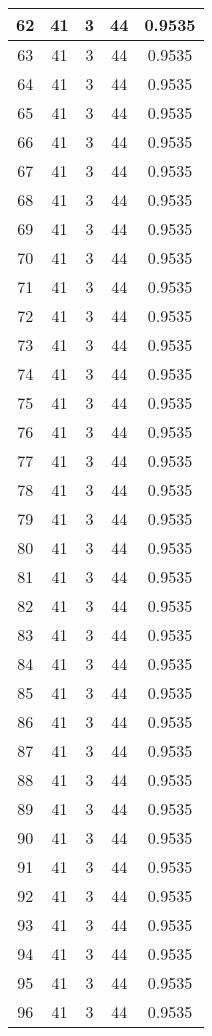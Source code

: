 \documentclass[letterpaper, 12pt]{article}
\begin{document}
\begin{longtable}{|c|c|c|c|c|}
\hline
62 & 41 & 3 & 44 & 0.9535 \\
\hline
63 & 41 & 3 & 44 & 0.9535 \\
\hline
64 & 41 & 3 & 44 & 0.9535 \\
\hline
65 & 41 & 3 & 44 & 0.9535 \\
\hline
66 & 41 & 3 & 44 & 0.9535 \\
\hline
67 & 41 & 3 & 44 & 0.9535 \\
\hline
68 & 41 & 3 & 44 & 0.9535 \\
\hline
69 & 41 & 3 & 44 & 0.9535 \\
\hline
70 & 41 & 3 & 44 & 0.9535 \\
\hline
71 & 41 & 3 & 44 & 0.9535 \\
\hline
72 & 41 & 3 & 44 & 0.9535 \\
\hline
73 & 41 & 3 & 44 & 0.9535 \\
\hline
74 & 41 & 3 & 44 & 0.9535 \\
\hline
75 & 41 & 3 & 44 & 0.9535 \\
\hline
76 & 41 & 3 & 44 & 0.9535 \\
\hline
77 & 41 & 3 & 44 & 0.9535 \\
\hline
78 & 41 & 3 & 44 & 0.9535 \\
\hline
79 & 41 & 3 & 44 & 0.9535 \\
\hline
80 & 41 & 3 & 44 & 0.9535 \\
\hline
81 & 41 & 3 & 44 & 0.9535 \\
\hline
82 & 41 & 3 & 44 & 0.9535 \\
\hline
83 & 41 & 3 & 44 & 0.9535 \\
\hline
84 & 41 & 3 & 44 & 0.9535 \\
\hline
85 & 41 & 3 & 44 & 0.9535 \\
\hline
86 & 41 & 3 & 44 & 0.9535 \\
\hline
87 & 41 & 3 & 44 & 0.9535 \\
\hline
88 & 41 & 3 & 44 & 0.9535 \\
\hline
89 & 41 & 3 & 44 & 0.9535 \\
\hline
90 & 41 & 3 & 44 & 0.9535 \\
\hline
91 & 41 & 3 & 44 & 0.9535 \\
\hline
92 & 41 & 3 & 44 & 0.9535 \\
\hline
93 & 41 & 3 & 44 & 0.9535 \\
\hline
94 & 41 & 3 & 44 & 0.9535 \\
\hline
95 & 41 & 3 & 44 & 0.9535 \\
\hline
96 & 41 & 3 & 44 & 0.9535 \\

\end{longtable}
\end{document}
